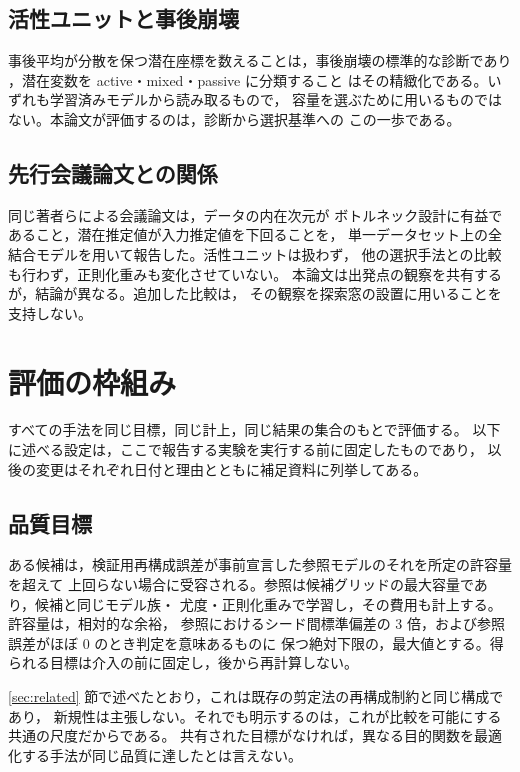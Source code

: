 \documentclass[11pt,a4paper]{jsarticle}
\begin{document}
\subsection{活性ユニットと事後崩壊}\label{sec:rel_au}

事後平均が分散を保つ潜在座標を数えることは，事後崩壊の標準的な診断であり
\cite{burda2016iwae,lucas2019elbo}，潜在変数を active・mixed・passive に分類すること
\cite{bonheme2023active}はその精緻化である。いずれも学習済みモデルから読み取るもので，
容量を選ぶために用いるものではない。本論文が評価するのは，診断から選択基準への
この一歩である。

\subsection{先行会議論文との関係}\label{sec:rel_nolta}

同じ著者らによる会議論文\cite{obata2025manifold}は，データの内在次元が
ボトルネック設計に有益であること，潜在推定値が入力推定値を下回ることを，
単一データセット上の全結合モデルを用いて報告した。活性ユニットは扱わず，
他の選択手法との比較も行わず，正則化重みも変化させていない。
本論文は出発点の観察を共有するが，結論が異なる。追加した比較は，
その観察を探索窓の設置に用いることを支持しない。

\section{評価の枠組み}\label{sec:framework}

すべての手法を同じ目標，同じ計上，同じ結果の集合のもとで評価する。
以下に述べる設定は，ここで報告する実験を実行する前に固定したものであり，
以後の変更はそれぞれ日付と理由とともに補足資料に列挙してある。

\subsection{品質目標}\label{sec:framework_quality}

ある候補は，検証用再構成誤差が事前宣言した参照モデルのそれを所定の許容量を超えて
上回らない場合に受容される。参照は候補グリッドの最大容量であり，候補と同じモデル族・
尤度・正則化重みで学習し，その費用も計上する。許容量は，相対的な余裕，
参照におけるシード間標準偏差の 3 倍，および参照誤差がほぼ 0 のとき判定を意味あるものに
保つ絶対下限の，最大値とする。得られる目標は介入の前に固定し，後から再計算しない。

\ref{sec:related} 節で述べたとおり，これは既存の剪定法の再構成制約と同じ構成であり，
新規性は主張しない。それでも明示するのは，これが比較を可能にする共通の尺度だからである。
共有された目標がなければ，異なる目的関数を最適化する手法が同じ品質に達したとは言えない。
\end{document}
